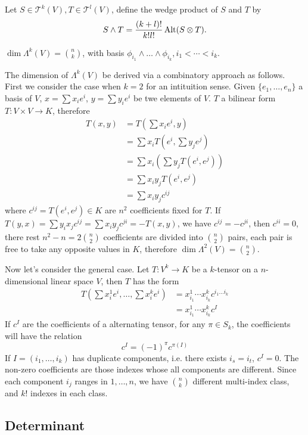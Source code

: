 Let $S \in \mathcal{T}^k(V), T \in \mathcal{T}^l(V)$,
define the wedge product of $S$ and $T$ by
$$S \wedge T = {(k + l)! \over k! l!}\mathop{\mathrm{Alt}}(S \otimes T).$$

$\dim \Lambda^k(V) = {n \choose k}$,
with basis $\phi_{i_1} \wedge \dots \wedge \phi_{i_k}, i_1 < \cdots < i_k$.

The dimension of $\Lambda^k(V)$ be derived via a combinatory approach as follows.
First we consider the case when $k=2$ for an intituition sense.
Given $\{e_1, \dots, e_n\}$ a basis of $V$,
$x = \sum x_i e^i$, $y = \sum y_i e^i$ be twe elements of $V$.
$T$ a bilinear form $T : V \times V \to K$,
therefore
\begin{align*}
  T(x, y)
  &= T(\sum x_i e^i, y) \\
  &= \sum x_i T(e^i, \sum y_j e^j) \\
  &= \sum x_i (\sum y_j T(e^i, e^j)) \\
  &= \sum x_i y_j T(e^i, e^j) \\
  &= \sum x_i y_j c^{ij}
\end{align*}
where $c^{ij} = T(e^i, e^j) \in K$ are $n^2$ coefficients fixed for $T$.
If $T(y, x) = \sum y_i x_j c^{ij} = \sum x_i y_j c^{ji} = -T(x, y)$,
we have $c^{ij} = -c^{ji}$, then $c^{ii} = 0$, there rest $n^2 - n = 2{n \choose 2}$
coefficients are divided into $n \choose 2$ pairs, each pair is free to take
any opposite values in $K$, therefore $\dim \Lambda^2(V) = {n \choose 2}$.

Now let's consider the general case.
Let $T : V^k \to K$ be a $k$-tensor on a $n$-dimensional linear space $V$,
then $T$ has the form
\begin{align*}
  T(\sum x_i^1 e^i, \dots, \sum x_i^k e^i)
  &= x_{i_1}^1 \cdots x_{i_k}^k c^{i_1 \dots i_k} \\
  &= x_{i_1}^1 \cdots x_{i_k}^k c^I
\end{align*}
If $c^I$ are the coefficients of a alternating tensor,
for any $\pi \in S_k$, the coefficients will have the relation
$$c^I = (-1)^\pi c^{\pi(I)}$$
If $I = (i_1, \dots, i_k)$ has duplicate components, i.e. there exists
$i_s = i_t$, $c^I = 0$. The non-zero coefficients are those indexes whose
all components are different. Since each component $i_j$ ranges in $1, \dots, n$,
we have ${n \choose k}$ different multi-index class, and $k!$ indexes in each class.

\subsection{Determinant}

